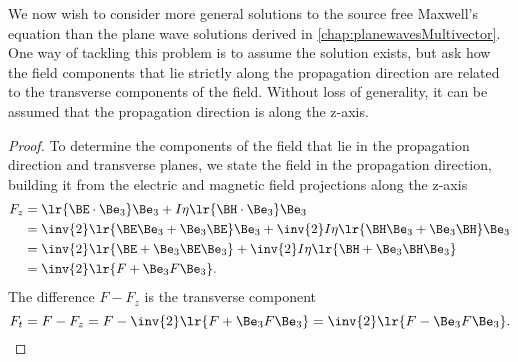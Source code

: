 %
%
We now wish to consider more general solutions to the source free Maxwell's equation than the plane wave solutions derived in \cref{chap:planewavesMultivector}.
One way of tackling this problem is to assume the solution exists, but ask how the field components that lie strictly along the propagation direction are related to the transverse components of the field.
Without loss of generality, it can be assumed that the propagation direction is along the z-axis.

\begin{proof}
To determine the components of the field that lie in the propagation direction and transverse planes, we state the field in the propagation direction, building it from the electric and magnetic field projections along the z-axis
\begin{equation}\label{eqn:transverseField:108}
\begin{aligned}
F_z
&=
\lr{ \BE \cdot \Be_3 }
 \Be_3
+ I \eta \lr{ \BH \cdot \Be_3 } \Be_3 \\
&=
\inv{2}
\lr{ \BE \Be_3 + \Be_3 \BE }
 \Be_3
+ \inv{2} I \eta \lr{ \BH \Be_3 + \Be_3 \BH } \Be_3 \\
&=
\inv{2}
\lr{ \BE + \Be_3 \BE \Be_3 }
+ \inv{2} I \eta \lr{ \BH + \Be_3 \BH \Be_3 } \\
&=
\inv{2} \lr{ F + \Be_3 F \Be_3 }.
\end{aligned}
\end{equation}
The difference \( F - F_z \) is the transverse component
\begin{dmath}\label{eqn:transverseField:308}
F_t
= F - F_z
=
F -
\inv{2} \lr{ F + \Be_3 F \Be_3 }
=
\inv{2} \lr{ F - \Be_3 F \Be_3 }.
\end{dmath}
\end{proof}

